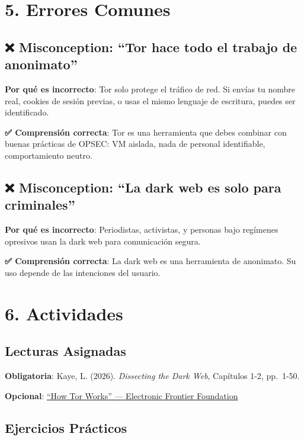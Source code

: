 \documentclass[
  letterpaper,
]{report}
\begin{document}
\section{5. Errores Comunes}\label{errores-comunes}

\subsection{❌ Misconception: ``Tor hace todo el trabajo de
anonimato''}\label{misconception-tor-hace-todo-el-trabajo-de-anonimato}

\textbf{Por qué es incorrecto}: Tor solo protege el tráfico de red. Si
envías tu nombre real, cookies de sesión previas, o usas el mismo
lenguaje de escritura, puedes ser identificado.

\textbf{✅ Comprensión correcta}: Tor es una herramienta que debes
combinar con buenas prácticas de OPSEC: VM aislada, nada de personal
identifiable, comportamiento neutro.

\subsection{❌ Misconception: ``La dark web es solo para
criminales''}\label{misconception-la-dark-web-es-solo-para-criminales}

\textbf{Por qué es incorrecto}: Periodistas, activistas, y personas bajo
regímenes opresivos usan la dark web para comunicación segura.

\textbf{✅ Comprensión correcta}: La dark web es una herramienta de
anonimato. Su uso depende de las intenciones del usuario.

\section{6. Actividades}\label{actividades}

\subsection{Lecturas Asignadas}\label{lecturas-asignadas}

\textbf{Obligatoria}: Kaye, L. (2026). \emph{Dissecting the Dark Web},
Capítulos 1-2, pp.~1-50.

\textbf{Opcional}:
\href{https://ssd.eff.org/en/module/how-tor-works}{``How Tor Works'' ---
Electronic Frontier Foundation}

\subsection{Ejercicios Prácticos}\label{ejercicios-pruxe1cticos}
\end{document}
